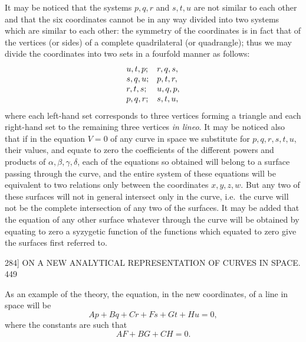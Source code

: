 \documentclass[11pt]{article}
\begin{document}
It may be noticed that the systems $p,q,r$ and $s,t,u$ are not similar to each
other and that the six coordinates cannot be in any way divided into two systems
which are similar to each other: the symmetry of the coordinates is in fact that of
the vertices (or sides) of a complete quadrilateral (or quadrangle); thus we may
divide the coordinates into two sets in a fourfold manner as follows:
\[ \begin{array}{l@{\quad}l}
u,t,p; & r,q,s,\\
s,q,u; & p,t,r,\\
r,t,s; & u,q,p,\\
p,q,r; & s,t,u,
\end{array} \]
where each left-hand set corresponds to three vertices forming a triangle and each
right-hand set to the remaining three vertices \textit{in lineo}. It may be noticed
also that if in the equation $V=0$ of any curve in space we substitute for
$p,q,r,s,t,u$, their values, and equate to zero the coefficients of the different
powers and products of $\alpha,\beta,\gamma,\delta$, each of the equations so
obtained will belong to a surface passing through the curve, and the entire system
of these equations will be equivalent to two relations only between the coordinates
$x,y,z,w$. But any two of these surfaces will not in general intersect only in the
curve, i.e.\ the curve will not be the complete intersection of any two of the
surfaces. It may be added that the equation of any other surface whatever through
the curve will be obtained by equating to zero a syzygetic function of the functions
which equated to zero give the surfaces first referred to.

\begin{center}
\textsc{284]} \hfill ON A NEW ANALYTICAL REPRESENTATION OF CURVES IN SPACE. \hfill 449
\end{center}

As an example of the theory, the equation, in the new coordinates, of a line in
space will be
\[ Ap+Bq+Cr+Fs+Gt+Hu=0, \]
where the constants are such that
\[ AF+BG+CH=0. \]
\end{document}
